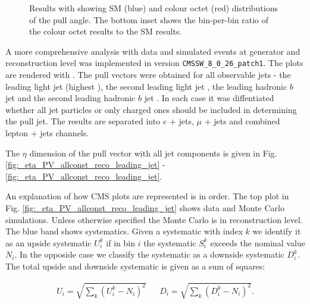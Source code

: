 \begin{figure}[htp]
\centering
  \def\twidth{0.45}
  \centering
  \hfil
\caption{Results with \RIVET showing SM (blue) and \PW colour octet (red) distributions of the pull angle. The bottom inset shows the bin-per-bin ratio of the \PW colour octet results to the SM results.}
\label{fig:resultsRivet}
\end{figure}

A more comprehensive analysis with data and simulated events at generator and reconstruction level was implemented in \CMSSW version \lstinline[language=sh]|CMSSW_8_0_26_patch1|. The plots are rendered with \ROOT \cite{Brun}. The pull vectors were obtained for all observable jets - the leading light jet \leadingjet (highest \pt), the second leading light jet \scndleadingjet, the leading hadronic $b$ jet \leadingb and the second leading hadronic $b$ jet \scndleadingb. In each case it was diffentiated whether all jet particles or only charged ones should be included in determining the pull jet. The results are separated into $e$ + jets, $\mu$ + jets and combined lepton + jets channels.

The $\eta$ dimension of the pull vector with all jet components is given in Fig. \ref{fig:_eta_PV_allconst_reco_leading_jet} - \ref{fig:_eta_PV_allconst_reco_leading_jet}.

An explanation of how CMS plots are represented is in order. The top plot in Fig. \ref{fig:_eta_PV_allconst_reco_leading_jet} shows data and Monte Carlo simulations. Unless otherwise specified the Monte Carlo is in reconstruction level. The blue band shows systematics. Given a systematic with index $k$ we identify it as an upside systematic $U^{k}_{i}$ if in bin $i$ the systematic $S^{k}_i$ exceeds the nominal value $N_{i}$. In the opposide case we classify the systematic as a downside systematic $D^{k}_{i}$. The total upside and downside systematic is given as a sum of squares:

\begin{align}
U_{i}=\sqrt{\sum_{k}\left(U^{k}_{i}-N_{i}\right)^{2}} && D_{i}=\sqrt{\sum_{k}\left(D^{k}_{i}-N_{i}\right)^{2}}.
\end{align}


